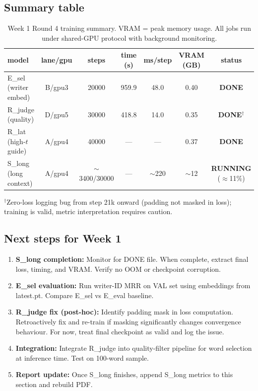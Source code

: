 \documentclass[10.5pt,a4paper]{article}
\begin{document}
\subsection{Summary table}
\begin{table}[H]
\centering
\caption{Week 1 Round 4 training summary. VRAM = peak memory usage. All jobs run under shared-GPU protocol with background monitoring.}
\label{tab:week1summary}
\small
\begin{tabular}{@{}lcccccc@{}}
\toprule
model & lane/gpu & steps & time (s) & ms/step & VRAM (GB) & status \\
\midrule
E\_sel (writer embed) & B/gpu3 & 20000 & 959.9 & 48.0 & 0.40 & \textbf{DONE} \\
R\_judge (quality) & D/gpu5 & 30000 & 418.8 & 14.0 & 0.35 & \textbf{DONE}$^{\dagger}$ \\
R\_lat (high-$t$ guide) & A/gpu4 & 40000 & --- & --- & 0.37 & \textbf{DONE} \\
S\_long (long context) & A/gpu4 & $\sim$3400/30000 & --- & $\sim$220 & $\sim$12 & \textbf{RUNNING} ($\approx$11\%) \\
\bottomrule
\end{tabular}
\par\smallskip\footnotesize $^{\dagger}$Zero-loss logging bug from step 21k onward (padding not masked in loss); training is valid, metric interpretation requires caution.
\end{table}

\subsection{Next steps for Week 1}
\begin{enumerate}
\item \textbf{S\_long completion:} Monitor for DONE file. When complete, extract final loss, timing, and VRAM. Verify no OOM or checkpoint corruption.
\item \textbf{E\_sel evaluation:} Run writer-ID MRR on VAL set using embeddings from latest.pt. Compare E\_sel vs E\_eval baseline.
\item \textbf{R\_judge fix (post-hoc):} Identify padding mask in loss computation. Retroactively fix and re-train if masking significantly changes convergence behaviour. For now, treat final checkpoint as valid and log the issue.
\item \textbf{Integration:} Integrate R\_judge into quality-filter pipeline for word selection at inference time. Test on 100-word sample.
\item \textbf{Report update:} Once S\_long finishes, append S\_long metrics to this section and rebuild PDF.
\end{enumerate}
\end{document}
